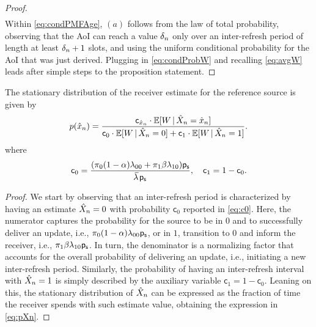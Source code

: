 \begin{prop}
\begin{proof}
\begin{align}
            \label{eq:condPMFAge}
        \end{align}
        Within \eqref{eq:condPMFAge}, $(a)$ follows from the law of total probability, observing that the AoI can reach a value $\delta_n$ only over an inter-refresh period of length at least $\delta_n+1$ slots, and using the uniform conditional probability for the AoI that was just derived. Plugging in \eqref{eq:condProbW} and recalling \eqref{eq:avgW} leads after simple steps to the proposition statement.
    \end{proof}
\end{prop}

\begin{prop}\label{prop:statEst}
    The stationary distribution of the receiver estimate for the reference source is given by    
    \begin{align}
        p(\hat{x}_n) = \frac{\mathsf c_{\hat{x}_n} \cdot \mathbb E[W \, | \, \hat{X}_n=\hat{x}_n]}{\mathsf c_{0} \cdot \mathbb E[W \, | \, \hat{X}_n=0] + \mathsf c_{1} \cdot \mathbb E[W \, | \, \hat{X}_n=1]}.
        \label{eq:pXn}
    \end{align}
    where 
    \begin{align}
        \mathsf c_0 = \frac{(\statZ (1-\qZO) \pTx_{00} + \statO \qOZ \pTx_{10})\ps}{\avgPTx \ps}, \quad  \mathsf c_1 = 1 - \mathsf c_0.
        \label{eq:c0}
    \end{align}
\end{prop}
\begin{proof}
    We start by observing that an inter-refresh period is characterized by having an estimate $\hat{X}_n=0$ with probability $\mathsf c_0$ reported in \eqref{eq:c0}. Here, the numerator captures the probability for the source to be in $0$ and to successfully deliver an update, i.e., $\pi_0(1-\alpha)\lambda_{00}\mathsf{p_s}$, or in $1$, transition to $0$ and inform the receiver, i.e., $\pi_1\beta\lambda_{10}\mathsf{p_s}$. In turn, the denominator is a normalizing factor that accounts for the overall probability of delivering an update, i.e., initiating a new inter-refresh period. Similarly, the probability of having an inter-refresh interval with $\hat{X}_n=1$ is simply described by the auxiliary variable $\mathsf c_1 = 1-\mathsf c_0$. Leaning on this, the stationary distribution of $\hat{X}_n$ can be expressed as the fraction of time the receiver spends with such estimate value, obtaining the expression in \eqref{eq:pXn}.
\end{proof}

